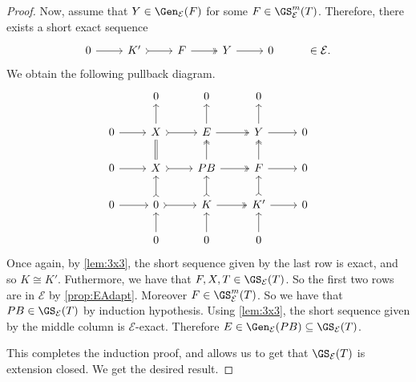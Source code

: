 \begin{proof}
Now, assume that $Y \in \Gen_\mathcal{E}(F)$ for some $F \in \GS_\mathcal{E}^m(T)$. Therefore, there exists a short exact sequence \[\begin{tikzcd}
	0 & K' & F  & Y &  0 & \in \mathcal{E}.
	\arrow[from=1-1, to=1-2]
	\arrow[tail, from=1-2, to=1-3]
	\arrow[two heads,from=1-3, to=1-4]
	\arrow[from=1-4, to=1-5]
\end{tikzcd} \] We obtain the following pullback diagram.
\[\begin{tikzcd}
         & 0 & 0 & 0 &  \\
	0 & X & E  & Y &  0 \\
     0 & X & PB & F & 0 \\
      0 & 0 & K & K' & 0 \\
       & 0 & 0 & 0 & 
	\arrow[from=2-1, to=2-2]
	\arrow[tail, from=2-2, to=2-3]
	\arrow[two heads,from=2-3, to=2-4]
	\arrow[from=2-4, to=2-5]
        \arrow[from=3-1, to=3-2]
	\arrow[tail, from=3-2, to=3-3]
	\arrow[two heads,from=3-3, to=3-4]
	\arrow[from=3-4, to=3-5]
        \arrow[from=4-1, to=4-2]
	\arrow[tail, from=4-2, to=4-3]
	\arrow[two heads,from=4-3, to=4-4]
	\arrow[from=4-4, to=4-5]
        \arrow[from=5-2, to=4-2]
	\arrow[tail, from=4-2, to=3-2]
	\arrow[equals,from=3-2, to=2-2]
	\arrow[from=2-2, to=1-2]
        \arrow[from=5-3, to=4-3]
	\arrow[tail, from=4-3, to=3-3]
	\arrow[two heads,from=3-3, to=2-3]
	\arrow[from=2-3, to=1-3]
        \arrow[from=5-4, to=4-4]
	\arrow[tail, from=4-4, to=3-4]
	\arrow[two heads,from=3-4, to=2-4]
	\arrow[from=2-4, to=1-4]
\end{tikzcd} \]
Once again, by \cref{lem:3x3}, the short sequence given by the last row is exact, and so $K \cong K'$. Futhermore, we have that $F,X,T \in \GS_{\mathcal{E}}(T)$. So the first two rows are in $\mathcal{E}$ by \cref{prop:EAdapt}. Moreover $F \in \GS^{m}_{\mathcal{E}}(T)$. So we have that $PB \in \GS_{\mathcal{E}}(T)$ by induction hypothesis. Using \cref{lem:3x3}, the short sequence given by the middle column is ${\mathcal{E}}$-exact. Therefore $E \in \Gen_\mathcal{E}(PB) \subseteq \GS_{\mathcal{E}}(T)$. 

This completes the induction proof, and allows us to get that $\GS_\mathcal{E}(T)$ is extension closed. We get the desired result.
\end{proof}